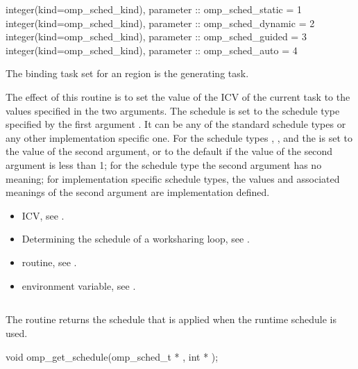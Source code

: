 \begin{samepage}
\fortranspecificstart
\begin{boxedcode}
integer(kind=omp\_sched\_kind), parameter :: omp\_sched\_static = 1
integer(kind=omp\_sched\_kind), parameter :: omp\_sched\_dynamic = 2
integer(kind=omp\_sched\_kind), parameter :: omp\_sched\_guided = 3
integer(kind=omp\_sched\_kind), parameter :: omp\_sched\_auto = 4
\end{boxedcode}
\fortranspecificend
\end{samepage}

\binding
The binding task set for an  region is the generating task. 

\effect
The effect of this routine is to set the value of the  ICV of the current task 
to the values specified in the two arguments. The schedule is set to the schedule type 
specified by the first argument . It can be any of the standard schedule types or 
any other implementation specific one. For the schedule types , , and 
 the  is set to the value of the second argument, or to the default 
 if the value of the second argument is less than 1; for the schedule type 
 the second argument has no meaning; for implementation specific schedule types, 
the values and associated meanings of the second argument are implementation defined.

\crossreferences
\begin{itemize}
\item {} ICV, see 
.

\item Determining the schedule of a worksharing loop, see 
.

\item {} routine, see 
.

\item {} environment variable, see 
.
\end{itemize}









\subsection{}
\label{subsec:omp_get_schedule}
\summary
The  routine returns the schedule that is applied when the 
runtime schedule is used. 
\format
\ccppspecificstart
\begin{boxedcode}
void omp\_get\_schedule(omp\_sched\_t * , int * ); 
\end{boxedcode}
\ccppspecificend

